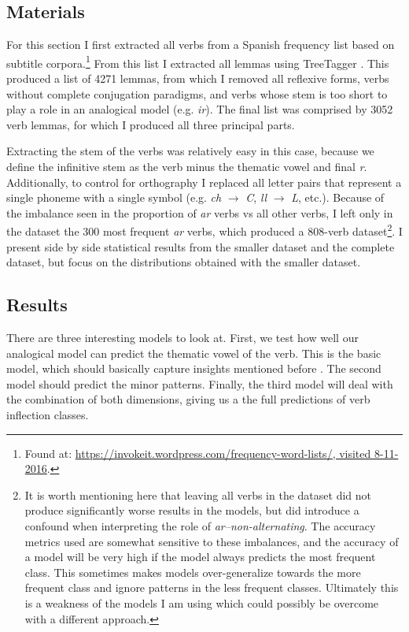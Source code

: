 \subsection{Materials}

For this section I first extracted all verbs from a Spanish frequency list based on subtitle corpora.\footnote{Found at: \url{https://invokeit.wordpress.com/frequency-word-lists/, visited 8-11-2016}.} From this list I extracted all lemmas using TreeTagger \autocite{Schmid.1995a}. This produced a list of 4271 lemmas, from which I removed all reflexive forms, verbs without complete conjugation paradigms, and verbs whose stem is too short to play a role in an analogical model (e.g. \textit{ir}). The final list was comprised by 3052 verb lemmas, for which I produced all three principal parts.

Extracting the stem of the verbs was relatively easy in this case, because we define the infinitive stem as the verb minus the thematic vowel and final \textit{r}. Additionally, to control for orthography I replaced all letter pairs that represent a single phoneme with a single symbol (e.g. \textit{ch} $\rightarrow$ \textit{C}, \textit{ll} $\rightarrow$ \textit{L}, etc.). Because of the imbalance seen in the proportion of \textit{ar} verbs vs all other verbs, I left only in the dataset the 300 most frequent \textit{ar} verbs, which produced a 808-verb dataset\footnote{It is worth mentioning here that leaving all verbs in the dataset did not produce significantly worse results in the models, but did introduce a confound when interpreting the role of \textit{ar--non-alternating}. The accuracy metrics used are somewhat sensitive to these imbalances, and the accuracy of a model will be very high if the model always predicts the most frequent class. This sometimes makes models over-generalize towards the more frequent class and ignore patterns in the less frequent classes. Ultimately this is a weakness of the models I am using which could possibly be overcome with a different approach.}. I present side by side statistical results from the smaller dataset and the complete dataset, but focus on the distributions obtained with the smaller dataset.

\subsection{Results}

There are three interesting models to look at. First, we test how well our analogical model can predict the thematic vowel of the verb. This is the basic model, which should basically capture insights mentioned before \autocite{Boye.2004}. The second model should predict the minor patterns. Finally, the third model will deal with the combination of both dimensions, giving us a the full predictions of verb inflection classes.

